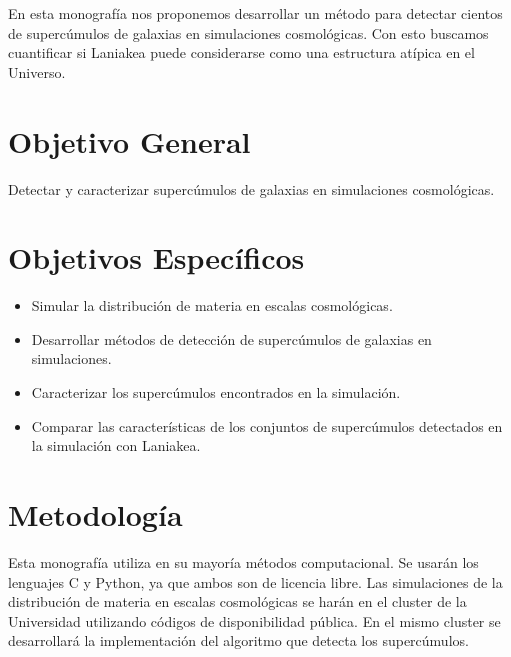 \documentclass[12pt]{article}
\begin{document}
En esta monograf\'{i}a nos proponemos desarrollar un m\'etodo para
detectar cientos de superc\'{u}mulos de galaxias en simulaciones
cosmol\'ogicas.  
Con esto buscamos cuantificar si Laniakea puede considerarse como una
estructura at\'ipica en el Universo.
\\

\section{Objetivo General}

Detectar y caracterizar superc\'{u}mulos de galaxias en simulaciones
cosmol\'{o}gicas. 
\\

\section{Objetivos Espec\'{i}ficos}

\begin{itemize}
	\item Simular la distribuci\'on de materia en escalas
          cosmol\'{o}gicas. 
	\item Desarrollar m\'{e}todos de detecci\'on de
          superc\'{u}mulos de galaxias en simulaciones.
	\item Caracterizar los superc\'umulos encontrados en la
          simulaci\'on.
        \item Comparar las caracter\'isticas de los conjuntos de
          superc\'umulos detectados en          la simulaci\'on con
          Laniakea. 
\end{itemize}

\section{Metodolog\'{i}a}

Esta monograf\'{i}a utiliza en su mayor\'{i}a m\'etodos computacional.  
Se usar\'{a}n los lenguajes C y Python, ya que ambos son de licencia
libre. 
Las simulaciones de la distribuci\'on de materia en escalas
cosmol\'ogicas se har\'an en el cluster de la Universidad utilizando
c\'odigos de disponibilidad p\'ublica.
En el mismo cluster se desarrollar\'a la implementaci\'on del
algoritmo que detecta los superc\'umulos.
\\
\end{document}
